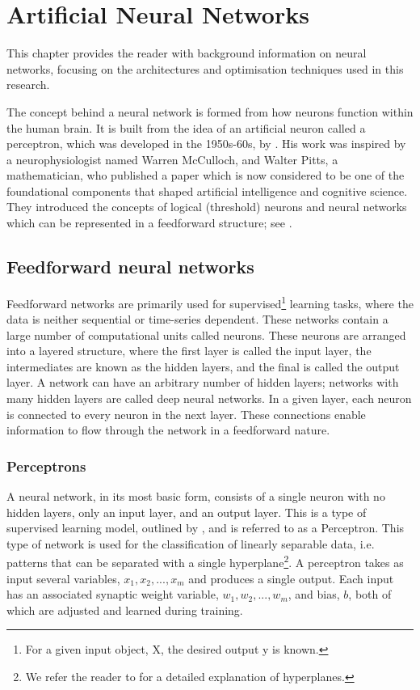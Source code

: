\chapter{Artificial Neural Networks}
    This chapter provides the reader with background information on neural networks, focusing on the architectures and optimisation techniques used in this research. 
    
    The concept behind a neural network is formed from how neurons function within the human brain. It is built from the idea of an artificial neuron called a perceptron, which was developed in the 1950s-60s, by \citeauthor{perceptron_paper}. His work was inspired by a neurophysiologist named Warren McCulloch, and Walter Pitts, a mathematician, who published a paper which is now considered to be one of the foundational components that shaped artificial intelligence and cognitive science. They introduced the concepts of logical (threshold) neurons and neural networks which can be represented in a feedforward structure; see \cite{McCulloch1943}. 
    
    \section{Feedforward neural networks}
        Feedforward networks are primarily used for supervised\footnote{For a given input object, X, the desired output y is known.} learning tasks, where the data is neither sequential or time-series dependent. These networks contain a large number of computational units called neurons. These neurons are arranged into a layered structure, where the first layer is called the input layer, the intermediates are known as the hidden layers, and the final is called the output layer.  A network can have an arbitrary number of hidden layers; networks with many hidden layers are called deep neural networks. In a given layer, each neuron is connected to every neuron in the next layer. These connections enable information to flow through the network in a feedforward nature. 
        
        \subsection{Perceptrons}
        A neural network, in its most basic form, consists of a single neuron with no hidden layers, only an input layer, and an output layer. This is a type of supervised learning model, outlined by \cite{perceptron_paper}, and is referred to as a Perceptron.  This type of network is used for the classification of linearly separable data, i.e. patterns that can be separated with a single hyperplane\footnote{We refer the reader to \cite{hyperplane} for a detailed explanation of hyperplanes.}. A perceptron takes as input several variables, $x _1,x _2,...,x _m$ and produces a single output. Each input has an associated synaptic weight variable, $w _1,w _2,...,w _m$, and bias, $b$, both of which are adjusted and learned during training. 

